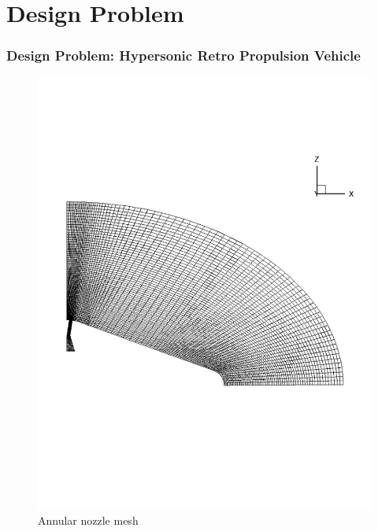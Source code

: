 \documentclass{beamer}
\begin{document}
\section{Design Problem}
\begin{frame}
  \frametitle{Design Problem: Hypersonic Retro Propulsion Vehicle}
  \begin{figure}[ht]
     \begin{minipage}[b]{0.4\linewidth}
         \centering
         \includegraphics[scale=0.2,trim={0 8cm 0 8cm}]{figures/from_peter/annular_grid}
         \caption{Annular nozzle mesh}
         \label{fig:annular_grid}
     \end{minipage}
     \hspace{0.5cm}
     \begin{minipage}[b]{0.4\linewidth}
         \centering

\end{minipage}
\end{figure}
\end{frame}
\end{document}
